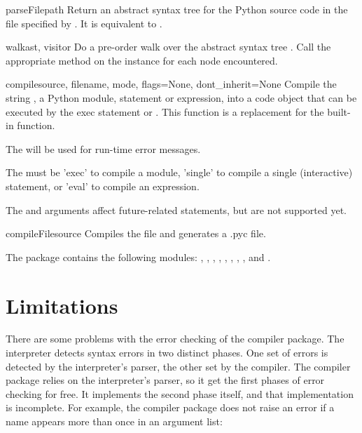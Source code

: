 \begin{funcdesc}{parseFile}{path}
Return an abstract syntax tree for the Python source code in the file
specified by .  It is equivalent to
.
\end{funcdesc}

\begin{funcdesc}{walk}{ast, visitor}
Do a pre-order walk over the abstract syntax tree .  Call the
appropriate method on the  instance for each node
encountered.
\end{funcdesc}

\begin{funcdesc}{compile}{source, filename, mode, flags=None, 
			dont_inherit=None}
Compile the string , a Python module, statement or
expression, into a code object that can be executed by the exec
statement or . This function is a replacement for the
built-in  function.

The  will be used for run-time error messages.

The  must be 'exec' to compile a module, 'single' to compile a
single (interactive) statement, or 'eval' to compile an expression.

The  and  arguments affect future-related
statements, but are not supported yet.
\end{funcdesc}

\begin{funcdesc}{compileFile}{source}
Compiles the file  and generates a .pyc file.
\end{funcdesc}

The  package contains the following modules:
, , ,
, , , ,
, and .

\section{Limitations}

There are some problems with the error checking of the compiler
package.  The interpreter detects syntax errors in two distinct
phases.  One set of errors is detected by the interpreter's parser,
the other set by the compiler.  The compiler package relies on the
interpreter's parser, so it get the first phases of error checking for
free.  It implements the second phase itself, and that implementation is
incomplete.  For example, the compiler package does not raise an error
if a name appears more than once in an argument list: 

